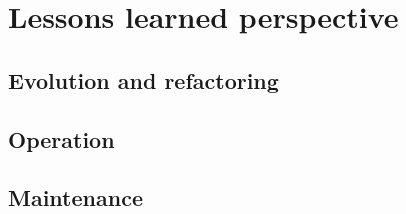 \section{Lessons learned perspective}

\subsection{Evolution and refactoring}
\subsection{Operation}
\subsection{Maintenance}